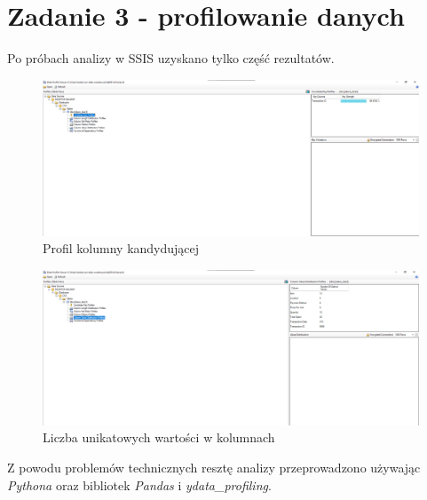 \documentclass[a4paper,12pt]{article}
\begin{document}
\section{Zadanie 3 - profilowanie danych}

Po próbach analizy w SSIS uzyskano tylko część rezultatów.

\begin{figure}[H]
  \centering
  \includegraphics[width=1.0\textwidth]{images/ssis_1.png}
  \caption{Profil kolumny kandydującej}
\end{figure}

\begin{figure}[H]
  \centering
  \includegraphics[width=1.0\textwidth]{images/ssis_2.png}
  \caption{Liczba unikatowych wartości w kolumnach}
\end{figure}

Z powodu problemów technicznych resztę analizy przeprowadzono używając \textit{Pythona} oraz bibliotek \textit{Pandas} i \textit{ydata\_profiling}.
\end{document}

